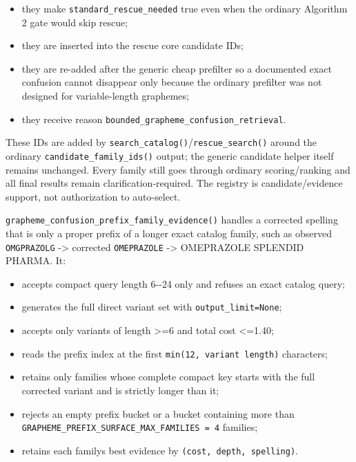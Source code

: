 \begin{itemize}
\tightlist
\item
  they make \texttt{standard\_\allowbreak{}rescue\_\allowbreak{}needed} true even when the ordinary Algorithm 2 gate would skip rescue;
\item
  they are inserted into the rescue core candidate IDs;
\item
  they are re-added after the generic cheap prefilter so a documented exact confusion cannot disappear only because the ordinary prefilter was not designed for variable-length graphemes;
\item
  they receive reason \texttt{bounded\_\allowbreak{}grapheme\_\allowbreak{}confusion\_\allowbreak{}retrieval}.
\end{itemize}

These IDs are added by \texttt{search\_\allowbreak{}catalog()}/\texttt{rescue\_\allowbreak{}search()} around the ordinary \texttt{candidate\_\allowbreak{}family\_\allowbreak{}ids()} output; the generic candidate helper itself remains unchanged. Every family still goes through ordinary scoring/ranking and all final results remain clarification-required. The registry is candidate/evidence support, not authorization to auto-select.

\texttt{grapheme\_\allowbreak{}confusion\_\allowbreak{}prefix\_\allowbreak{}family\_\allowbreak{}evidence()} handles a corrected spelling that is only a proper prefix of a longer exact catalog family, such as observed \texttt{OMGPRAZOLG} -\textgreater{} corrected \texttt{OMEPRAZOLE} -\textgreater{} OMEPRAZOLE SPLENDID PHARMA. It:

\begin{itemize}
\tightlist
\item
  accepts compact query length 6-\/-24 only and refuses an exact catalog query;
\item
  generates the full direct variant set with \texttt{output\_\allowbreak{}limit=None};
\item
  accepts only variants of length \textgreater=6 and total cost \textless=1.40;
\item
  reads the prefix index at the first \texttt{min(12,\ variant\ length)} characters;
\item
  retains only families whose complete compact key starts with the full corrected variant and is strictly longer than it;
\item
  rejects an empty prefix bucket or a bucket containing more than \texttt{GRAPHEME\_\allowbreak{}PREFIX\_\allowbreak{}SURFACE\_\allowbreak{}MAX\_\allowbreak{}FAMILIES\ =\ 4} families;
\item
  retains each family\textquotesingle s best evidence by \texttt{(cost,\ depth,\ spelling)}.
\end{itemize}

